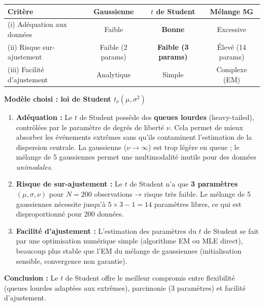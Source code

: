 \documentclass[12pt,a4paper]{article}
\begin{document}
\begin{solution}

\begin{center}
\renewcommand{\arraystretch}{1.8}
\begin{tabular}{@{}lccc@{}}
\toprule
\textbf{Critère} & \textbf{Gaussienne} & \textbf{$t$ de Student} & \textbf{Mélange 5G} \\
\midrule
(i) Adéquation aux données & Faible & \textbf{Bonne} & Excessive \\
(ii) Risque sur-ajustement & Faible (2 params) & \textbf{Faible (3 params)} & Élevé (14 params) \\
(iii) Facilité d'ajustement & Analytique & Simple & Complexe (EM) \\
\bottomrule
\end{tabular}
\end{center}

\medskip
\textbf{Modèle choisi : loi de Student $t_\nu(\mu, \sigma^2)$}

\begin{enumerate}[label=(\roman*),itemsep=6pt]
  \item \textbf{Adéquation :}
  Le $t$ de Student possède des \textbf{queues lourdes} (heavy-tailed), contrôlées par
  le paramètre de degrés de liberté $\nu$.
  Cela permet de mieux absorber les événements extrêmes sans qu'ils contaminent
  l'estimation de la dispersion centrale.
  La gaussienne ($\nu \to \infty$) est trop légère en queue ; le mélange de 5 gaussiennes
  permet une multimodalité inutile pour des données \emph{unimodales}.

  \item \textbf{Risque de sur-ajustement :}
  Le $t$ de Student n'a que \textbf{3 paramètres} $(\mu, \sigma, \nu)$
  pour $N = 200$ observations → risque très faible.
  Le mélange de 5 gaussiennes nécessite jusqu'à $5 \times 3 - 1 = 14$ paramètres libres,
  ce qui est disproportionné pour 200 données.

  \item \textbf{Facilité d'ajustement :}
  L'estimation des paramètres du $t$ de Student se fait par une optimisation numérique
  simple (algorithme EM ou MLE direct), beaucoup plus stable que l'EM
  du mélange de gaussiennes (initialisation sensible, convergence non garantie).
\end{enumerate}

\textbf{Conclusion :} Le $t$ de Student offre le meilleur compromis entre flexibilité
(queues lourdes adaptées aux extrêmes), parcimonie (3 paramètres) et facilité d'ajustement.
\end{solution}
\end{document}
